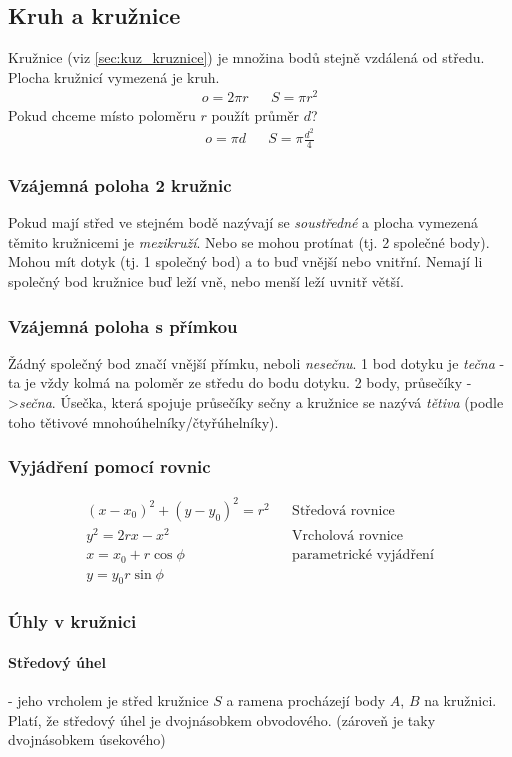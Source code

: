 \documentclass[12pt]{article}
\begin{document}
\subsection{Kruh a kružnice}
Kružnice (viz \ref{sec:kuz_kruznice}) je množina bodů stejně vzdálená od středu. Plocha kružnicí vymezená je kruh.
\begin{align}
o = 2\pi r && S = \pi r^2
\end{align}
Pokud chceme místo poloměru $r$ použít průměr $d$?
\begin{align}
o = \pi d && S = \pi \frac{d^2}{4}
\end{align}
\subsubsection{Vzájemná poloha 2 kružnic}
Pokud mají střed ve stejném bodě nazývají se \emph{soustředné} a plocha vymezená těmito kružnicemi je \emph{mezikruží}. Nebo se mohou protínat (tj. 2 společné body). Mohou mít dotyk (tj. 1 společný bod) a to buď vnější nebo vnitřní. Nemají li společný bod kružnice buď leží vně, nebo menší leží uvnitř větší.
\subsubsection{Vzájemná poloha s přímkou}
Žádný společný bod značí vnější přímku, neboli \emph{nesečnu}. 1 bod dotyku je \emph{tečna} - ta je vždy kolmá na poloměr ze středu do bodu dotyku. 2 body, průsečíky ->\emph{sečna}. Úsečka, která spojuje průsečíky sečny a kružnice se nazývá \emph{tětiva} (podle toho tětivové mnohoúhelníky/čtyřúhelníky).
\subsubsection{Vyjádření pomocí rovnic}
\begin{align}
(x-x_0)^2 + (y - y_0)^2 = r^2 && \text{Středová rovnice}\\
y^2 = 2rx- x^2 && \text{Vrcholová rovnice}\\
x = x_0 + r \cos\phi &&\text{parametrické vyjádření}\\
y =y_0 r\sin\phi
\end{align}
\subsubsection{Úhly v kružnici}
\paragraph{Středový úhel} - jeho vrcholem je střed kružnice $S$ a ramena procházejí body $A$, $B$ na kružnici. Platí, že středový úhel je dvojnásobkem obvodového. (zároveň je taky dvojnásobkem úsekového)
\end{document}
